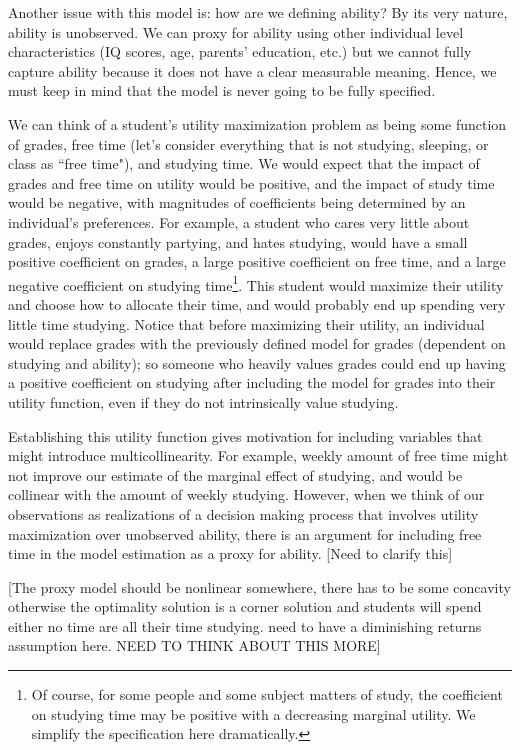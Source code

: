 \documentclass[12pt]{article}
\begin{document}
Another issue with this model is: how are we defining ability? By its very nature, ability is unobserved. We can proxy for ability using other individual level characteristics (IQ scores, age, parents' education, etc.) but we cannot fully capture ability because it does not have a clear measurable meaning. Hence, we must keep in mind that the model is never going to be fully specified.

We can think of a student's utility maximization problem as being some function of grades, free time (let's consider everything that is not studying, sleeping, or class as ``free time"), and studying time. We would expect that the impact of grades and free time on utility would be positive, and the impact of study time would be negative, with magnitudes of coefficients being determined by an individual's preferences. For example, a student who cares very little about grades, enjoys constantly partying, and hates studying, would have a small positive coefficient on grades, a large positive coefficient on free time, and a large negative coefficient on studying time\footnote{Of course, for some people and some subject matters of study, the coefficient on studying time may be positive with a decreasing marginal utility. We simplify the specification here dramatically.}. This student would maximize their utility and choose how to allocate their time, and would probably end up spending very little time studying. Notice that before maximizing their utility, an individual would replace grades with the previously defined model for grades (dependent on studying and ability); so someone who heavily values grades could end up having a positive coefficient on studying after including the model for grades into their utility function, even if they do not intrinsically value studying.

Establishing this utility function gives motivation for including variables that might introduce multicollinearity. For example, weekly amount of free time might not improve our estimate of the marginal effect of studying, and would be collinear with the amount of weekly studying. However, when we think of our observations as realizations of a decision making process that involves utility maximization over unobserved ability, there is an argument for including free time in the model estimation as a proxy for ability. \textcolor{BlueGreen}{[Need to clarify this]}

\textcolor{BlueGreen}{[The proxy model should be nonlinear somewhere, there has to be some concavity otherwise the optimality solution is a corner solution and students will spend either no time are all their time studying. need to have a diminishing returns assumption here. NEED TO THINK ABOUT THIS MORE]}
\end{document}
